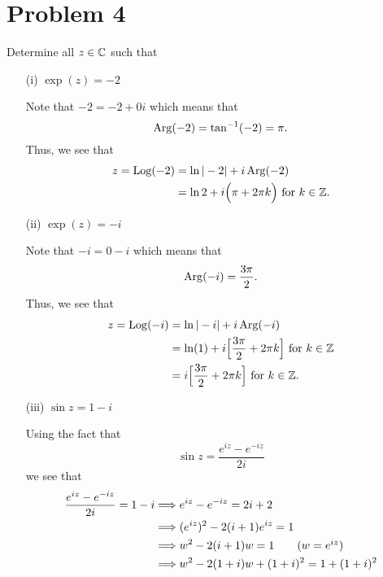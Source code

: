 \documentclass[a4paper]{article}
\begin{document}
\section*{Problem 4}
Determine all \( z \in \mathbb{C}  \) such that 
\begin{enumerate}
    \item[(i)] \( \exp(z) = -2 \)
        \begin{solution}
        Note that \( -2 = -2 + 0i \) which means that 
        \[  \operatorname{Arg}(-2) = \tan^{-1}(-2) = \pi. \]
        Thus, we see that 
        \begin{align*}
            z = \operatorname{Log}(-2) &= \ln | -2 |  + i \operatorname{Arg}(-2) \\
                     &= \ln 2 + i \Big( \pi + 2\pi k    \Big) \  \text{for} \ k \in \mathbb{Z}. 
        \end{align*}
        \end{solution}
    \item[(ii)] \( \exp(z) = -i \)
        \begin{solution}
        Note that \( -i = 0 - i \) which means that 
        \[  \operatorname{Arg}(-i) = \frac{ 3 \pi }{ 2 }. \]
        Thus, we see that
        \begin{align*}
            z =  \operatorname{Log}(-i) &= \ln | -i |  + i \operatorname{Arg}(-i) \\
                          &=  \ln (1) + i \Big[\frac{ 3 \pi  }{  2  }  + 2 \pi k \Big] \ \text{for} \ k \in \mathbb{Z} \\ 
                          &= i\Big[\frac{ 3 \pi  }{  2  }  + 2 \pi k \Big] \ \text{for} \ k \in \mathbb{Z}. 
        \end{align*}
        \end{solution}
    \item[(iii)] \( \sin z = 1 - i \)
        \begin{solution}
        Using the fact that 
        \[  \sin z = \frac{ e^{iz} - e^{-iz} }{ 2i }  \]
        we see that
        \begin{align*}
            \frac{ e^{iz} - e^{-iz} }{ 2i  } = 1 - i &\Longrightarrow  e^{iz} - e^{-iz} = 2i + 2  \\
                                                     &\Longrightarrow (e^{iz})^{2} - 2(i+1) e^{iz} = 1 \\ 
                                                     &\Longrightarrow w^{2} - 2(i+1)w = 1  \tag{\( w = e^{iz} \)}\\
                                                     &\Longrightarrow w^{2} -2(1+i) w + (1+i)^{2} = 1 + (1+i)^{2} \\

\end{align*}
\end{solution}
\end{enumerate}
\end{document}
